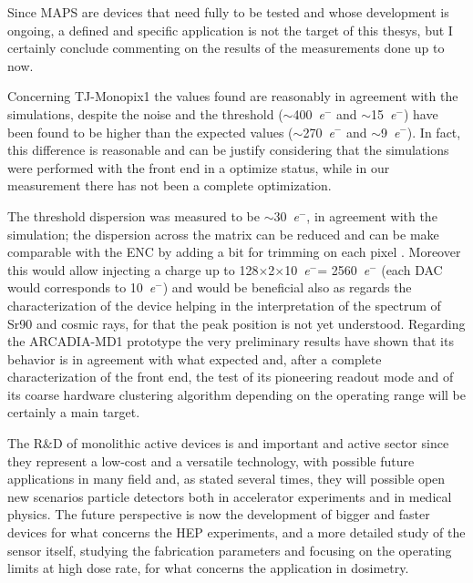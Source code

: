 Since MAPS are devices that need fully to be tested and whose development is ongoing, a defined and specific application is not the target of this thesys, but I certainly conclude commenting on the results of the measurements done up to now. 
 
Concerning TJ-Monopix1 the values found are reasonably in agreement with the simulations, despite the noise and the threshold ($\sim$\SI{400}{\elementarycharge}$^-$ and $\sim$\SI{15}{\elementarycharge}$^-$) have been found to be higher than the expected values ($\sim$\SI{270}{\elementarycharge}$^-$ and $\sim$\SI{9}{\elementarycharge}$^-$). In fact, this difference is reasonable and can be justify considering that the simulations were performed with the front end in a optimize status, while in our measurement there has not been a complete optimization. 

The threshold dispersion was measured to be $\sim$\SI{30}{\elementarycharge}$^-$, in agreement with the simulation; the dispersion across the matrix can be reduced and can be make comparable with the ENC by adding a bit for trimming on each pixel . Moreover this would allow injecting a charge up to 128$\times$2$\times$\SI{10}{\elementarycharge}$^-$= \SI{2560}{\elementarycharge}$^-$ (each DAC would corresponds to \SI{10}{\elementarycharge}$^-$) and would be beneficial also as regards the characterization of the device helping in the interpretation of the spectrum of Sr90 and cosmic rays, for that the peak position is not yet understood.
Regarding the ARCADIA-MD1 prototype the very preliminary results have shown that its behavior is in agreement with what expected and, after a complete characterization of the front end, the test of its pioneering readout mode and of its coarse hardware clustering algorithm depending on the operating range will be certainly a main target.

The R$\&$D of monolithic active devices is and important and active sector since they represent a low-cost and a versatile technology, with possible future applications in many field and, as stated several times, they will possible open new scenarios particle detectors both in accelerator experiments and in medical physics.
The future perspective is now the development of bigger and faster devices for what concerns the HEP experiments, and a more detailed study of the sensor itself, studying the fabrication parameters and focusing on the operating limits at high dose rate, for what concerns the application in dosimetry.

